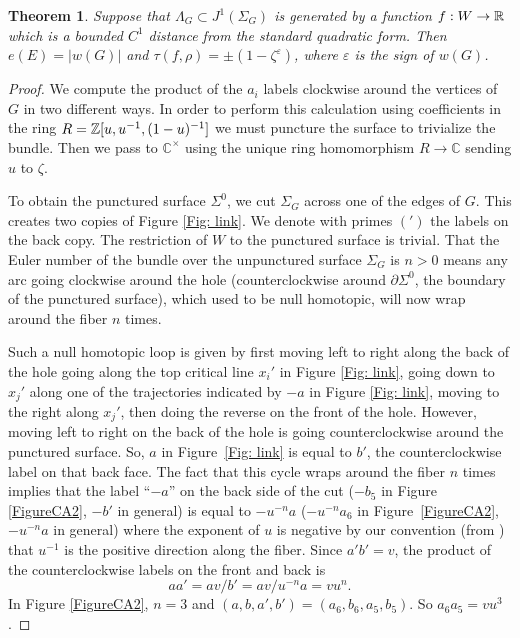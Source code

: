 \documentclass[11pt]{article}
\numberwithin{equation}{section}\providecommand{\dpl}{\displaystyle}
\theoremstyle{plain}
\newtheorem{theorem}{Theorem}[section]
\theoremstyle{definition}
\let\ve\varepsilon
\newcommand{\bC}{\mathbb{C}}\newcommand{\bD}{\mathbb{D}}
\begin{document}
\begin{theorem}\label{thm: punching hole}
Suppose that $\Lambda_G\subset J^1(\Sigma_G)$ is generated by a function $f:W\to \mathbb{R}$ which is a bounded $C^1$ distance from the standard quadratic form. Then $e(E)= |w(G)|$ and $\tau(f,\rho)=\pm(1-\zeta^\ve)$, where $\ve$ is the sign of $w(G)$.
\end{theorem}

\begin{proof} We compute the product of the $a_i$ labels clockwise around the vertices of~$G$ in two different ways. In order to perform this calculation using coefficients in the ring $R=\mathbb{Z}[u,u^{-1},(1-u)^{-1}]$ we must puncture the surface to trivialize the bundle. Then we pass to $\bC^\times$ using the unique ring homomorphism $R\to \bC$ sending $u$ to $\zeta$.

To obtain the punctured surface $\Sigma^0$, we cut $\Sigma_G$ across one of the edges of $G$. This creates two copies of Figure \ref{Fig: link}. We denote with primes $(')$ the labels on the back copy. The restriction of $W$ to the punctured surface is trivial. That the Euler number of the bundle over the unpunctured surface $\Sigma_G$ is $n>0$ means any arc going clockwise around the hole (counterclockwise around $\partial\Sigma^0$, the boundary of the punctured surface), which used to be null homotopic, will now wrap around the fiber $n$ times.

Such a null homotopic loop is given by first moving left to right along the back of the hole going along the top critical line $x_i'$ in Figure \ref{Fig: link}, going down to $x_j'$ along one of the trajectories indicated by $-a$ in Figure \ref{Fig: link}, moving to the right along $x_j'$, then doing the reverse on the front of the hole. However, moving left to right on the back of the hole is going counterclockwise around the punctured surface. So, $a$ in Figure~\ref{Fig: link} is equal to $b'$, the counterclockwise label on that back face. The fact that this cycle wraps around the fiber $n$ times implies that the label ``$-a$'' on the back side of the cut ($-b_5$ in Figure \ref{FigureCA2}, $-b'$ in general) is equal to $-u^{-n}a$ ($-u^{-n}a_6$ in Figure~\ref{FigureCA2}, $-u^{-n}a$ in general) where the exponent of $u$ is negative by our convention (from \cite{IK93}) that $u^{-1}$ is the positive direction along the fiber. Since $a'b'=v$, the product of the counterclockwise labels on the front and back is
\[
aa'=av/b'=av/u^{-n}a=vu^n.
\]
In Figure \ref{FigureCA2}, $n=3$ and $(a,b,a',b')=(a_6,b_6,a_5,b_5)$. So $a_6a_5=vu^3$.


\end{proof}
\end{document}
